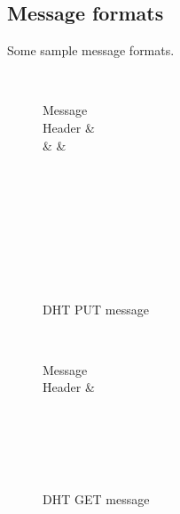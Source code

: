 \documentclass[a4paper, 11pt]{article}
\begin{document}
\cite{ChordPaper}

\subsection*{Message formats}

Some sample message formats.
\begin{figure}[h!]
	\centering
	\begin{bytefield}[bitwidth=0.8em]{32}
		 \\
		\begin{rightwordgroup}{Message \\  Header}
			 &  \\
			 &  & 
		\end{rightwordgroup} \\
		 \\
		\skippedwords \\
		 \\
		 \\
		\skippedwords \\
		 \\
	\end{bytefield}
	\caption{DHT PUT message}
	\label{DHTPUT}
\end{figure}

\begin{figure}[h!]
	\centering
	\begin{bytefield}[bitwidth=0.8em]{32}
		 \\
		\begin{rightwordgroup}{Message \\  Header}
			 & 
		\end{rightwordgroup} \\
		 \\
		\skippedwords \\
		 \\
	\end{bytefield}
	\caption{DHT GET message}
	\label{DHTGET}
\end{figure}
\end{document}
